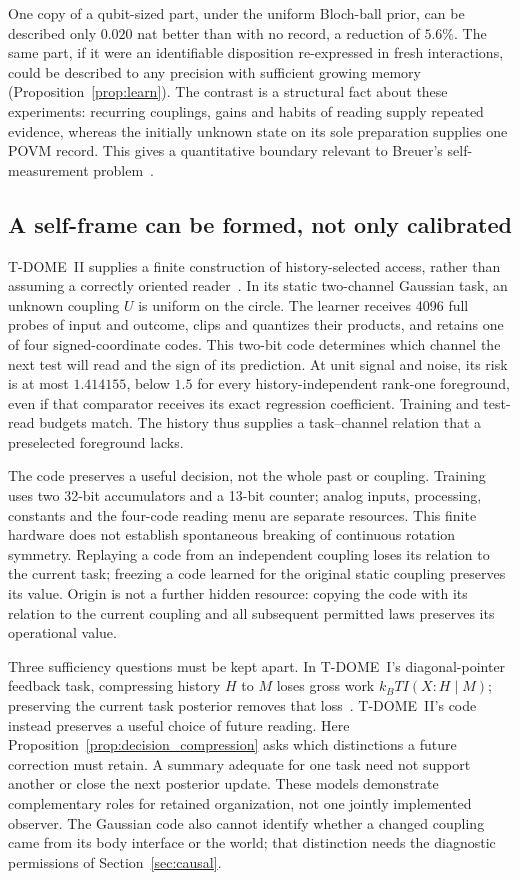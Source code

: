 \documentclass[12pt]{article}
\theoremstyle{definition}
\theoremstyle{remark}
\begin{document}
One copy of a qubit-sized part, under the uniform Bloch-ball prior, can be described only $0.020$ nat better than with no record, a reduction of $5.6\%$. The same part, if it were an identifiable disposition re-expressed in fresh interactions, could be described to any precision with sufficient growing memory (Proposition~\ref{prop:learn}). The contrast is a structural fact about these experiments: recurring couplings, gains and habits of reading supply repeated evidence, whereas the initially unknown state on its sole preparation supplies one POVM record. This gives a quantitative boundary relevant to Breuer's self-measurement problem~\cite{Breuer1995}.

\subsection{A self-frame can be formed, not only calibrated}
\label{sec:formation}

T-DOME~II supplies a finite construction of history-selected access,
rather than assuming a correctly oriented reader~\cite{TDOMEII}.
In its static two-channel Gaussian task, an unknown coupling $U$ is
uniform on the circle. The learner receives 4096 full probes of input
and outcome, clips and quantizes their products, and retains one of four
signed-coordinate codes. This two-bit code determines which channel
the next test will read and the sign of its prediction.
At unit signal and noise, its risk is at most $1.414155$, below $1.5$
for every history-independent rank-one foreground, even if that
comparator receives its exact regression coefficient.
Training and test-read budgets match. The history thus supplies a
task--channel relation that a preselected foreground lacks.

The code preserves a useful decision, not the whole past or coupling.
Training uses two 32-bit accumulators and a 13-bit counter; analog
inputs, processing, constants and the four-code reading menu are
separate resources. This finite hardware does not establish spontaneous
breaking of continuous rotation symmetry.
Replaying a code from an independent coupling loses its relation to
the current task; freezing a code learned for the original static
coupling preserves its value. Origin is not a further hidden resource:
copying the code with its relation to the current coupling and all
subsequent permitted laws preserves its operational value.

Three sufficiency questions must be kept apart.
In T-DOME~I's diagonal-pointer feedback task, compressing history $H$
to $M$ loses gross work $k_BT I(X:H\mid M)$; preserving the current
task posterior removes that loss~\cite{TDOMEI}.
T-DOME~II's code instead preserves a useful choice of future reading.
Here Proposition~\ref{prop:decision_compression} asks which distinctions
a future correction must retain.
A summary adequate for one task need not support another or close the
next posterior update. These models demonstrate complementary roles
for retained organization, not one jointly implemented observer.
The Gaussian code also cannot identify whether a changed coupling came
from its body interface or the world; that distinction needs the
diagnostic permissions of Section~\ref{sec:causal}.
\end{document}

